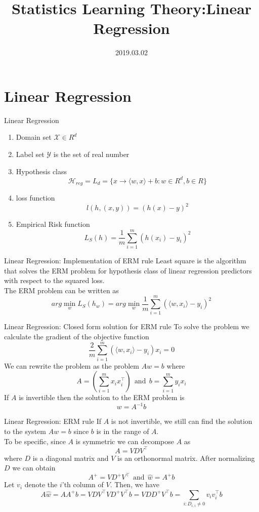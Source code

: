 \documentclass{beamer}
\title[Introduction]{Statistics Learning Theory:Linear Regression}
\author{}
\institute{}
\date{2019.03.02}
\begin{document}
\begin{frame}
  \titlepage
\end{frame}


\section{Linear Regression}
\begin{frame}{Linear Regression}
	\begin{enumerate}
		\item Domain set $\mathcal{X} \in R^d$
		\item Label set $\mathcal{Y}$ is the set of real number
		\item Hypothesis class
			\[\mathcal{H}_{reg} = L_d = \{x \rightarrow \langle w,x \rangle + b: w \in R^d, b \in R\}\]
		\item loss function
			\[l(h,(x,y)) = (h(x) - y)^2\]
		\item Empirical Risk function
			\[L_S(h) = \frac{1}{m} \sum^m_{i=1} (h(x_i) - y_i)^2\]
	\end{enumerate}
\end{frame}
\begin{frame}{Linear Regression: Implementation of ERM rule}
	Least square is the algorithm that solves the ERM problem for hypothesis class of linear regression predictors with respect to the squared loss. \\
	The ERM problem can be written as 
	\[arg \min_{w} L_S(h_w) = arg \min_w \frac{1}{m} \sum^m_{i=1} (\langle w,x_i \rangle - y_i)^2\]
\end{frame}
\begin{frame}{Linear Regression: Closed form solution for ERM rule}
	To solve the problem we calculate the gradient of the objective function
	\[\frac{2}{m} \sum^m_{i=1} (\langle w, x_i \rangle - y_i)x_i = 0\]
	We can rewrite the problem as the problem $Aw = b$ where
	\[A = (\sum^m_{i=1} x_i x^{\intercal}_i) \ \  \text{and} \ \ b=\sum^m_{i=1} y_i x_i \]
	If $A$ is invertible then the solution to the ERM problem is 
	\[w = A^{-1} b\]
\end{frame}
\begin{frame}{Linear Regression: ERM rule}
	If $A$ is not invertible, we still can find the solution to the system $Aw = b$ since $b$ is in the range of $A$.
	\\
	To be specific, since $A$ is symmetric we can decompose $A$ as 
	\[A = VDV^{\intercal}\]
	where $D$ is a diagonal matrix and $V$ is an orthonormal matrix. After normalizing $D$ we can obtain
	\[A^{+} = VD^{+}V^{\intercal} \ \ \text{and} \ \ \hat{w} = A^{+} b\]
	Let $v_i$ denote the $i$'th column of $V$. Then, we have 
\[A \hat{w} = A A^{+} b = VDV^{\intercal} VD^{+}V^{\intercal} b = VDD^{+} V^{\intercal} b = \sum_{i:D_{i,i} \neq 0} v_i v^{\intercal}_i b\]
\end{frame}
\end{document}
